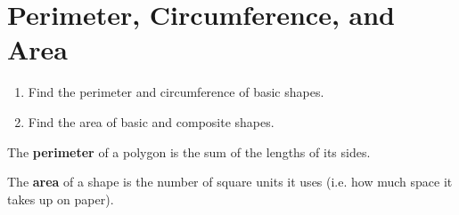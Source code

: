 \documentclass{article}
\begin{document}
\section*{Perimeter, Circumference, and Area}

\begin{tcolorbox}[colframe=orange!70!white, coltitle=black, title=\textbf{Today I Can}]
\begin{enumerate}
    \item Find the perimeter and circumference of basic shapes.
    \item Find the area of basic and composite shapes.
\end{enumerate}
\end{tcolorbox}

\begin{tcolorbox}[colframe=black!20!white, opacitybacktitle=0.1, coltitle=black, title=\textbf{Perimeter}]
The \textbf{perimeter} of a polygon is the sum of the lengths of its sides.
\end{tcolorbox}

\begin{tcolorbox}[colframe=black!20!white, opacitybacktitle=0.1, coltitle=black, title=\textbf{Area}]
The \textbf{area} of a shape is the number of square units it uses (i.e. how much space it takes up on paper).
\end{tcolorbox}

\vspace{0.25in}
\end{document}
